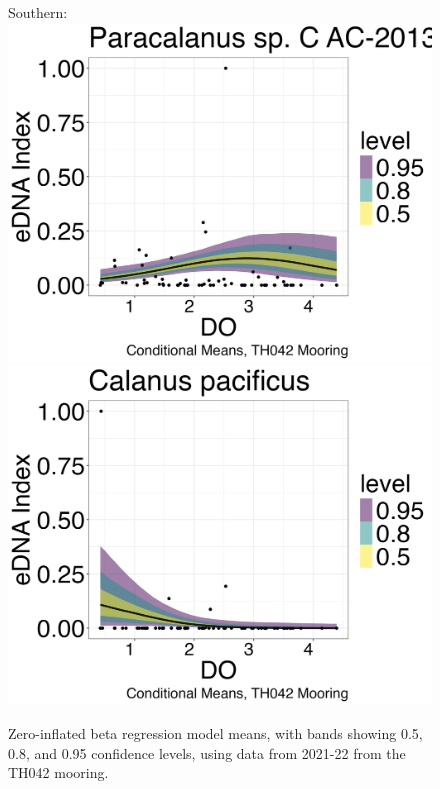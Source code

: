 \documentclass[12pt,twoside]{reedthesis}
\begin{document}
\begin{figure}[h]
\begin{center}
			Southern: \\
			\includegraphics[scale=0.25]{Paracalanus_ZOIB_Means_noOut}
			\includegraphics[scale=0.25]{Cpacificus_ZOIB_Means_noOut}
			\caption[Zero-inflated beta regression means]{\footnotesize{Zero-inflated beta regression model means, with bands showing 0.5, 0.8, and 0.95 confidence levels, using data from 2021-22 from the TH042 mooring.}} %
			\label{ZOIB}
		\end{center}
	\end{figure}
	
\end{document}
